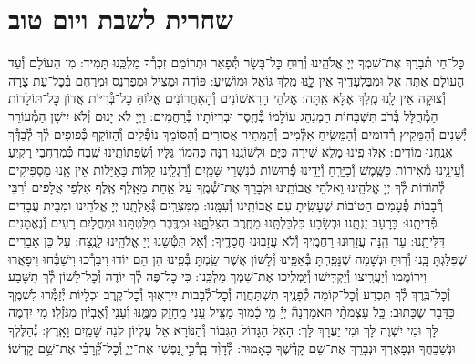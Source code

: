 \documentclass[twoside, openany, parskip=half, 11pt]{book}
\begin{document}
\chapter[שחרית לשבת ויו״ט]{ שחרית לשבת ויום טוב }




\label{nishmas}
כׇּל־חַי תְּ֯בָרֵךְ אֶת־שִׁמְךָ יְיָ אֱלֹהֵֽינוּ וְ֯רֽוּחַ כׇּל־בָּשָׂר תְּ֯פָאֵר וּתְרוֹמֵם זִכְרְ֯ךָ מַלְכֵּֽנוּ תָּמִיד: מִן הָעוֹלָם וְ֯עַד הָעוֹלָם אַתָּה אֵל וּמִבַּלְעָדֶֽיךָ אֵין לׇׇׇֽנּוּ מֶֽלֶךְ גּוֹאֵל וּמוֹשִֽׁיעַ:
פּוֹדֶה וּמַצִיל וּמְפַרְנֵס וּמְרַחֵם בְּ֯כׇל־עֵת צָרָה וְ֯צוּקָה אֵין לָֽנוּ מֶֽלֶךְ אֶלָּא אַֽתָּה: אֱלֹהֵי הָרִאשׁוֹנִים וְ֯הָאַחֲרוֹנִים אֱלֽוֹהַּ כׇּל־בְּ֯רִיּוֹת אֲדוֹן כׇּל־תּוֹלָדוֹת הַמְ֯הֻלָּל בְּ֯רֹב תִּשְׁבָּחוֹת הַמְנַהֵג עוֹלָמוֹ בְּ֯חֶֽסֶד וּבְרִיּוֹתָיו בְּ֯רַחֲמִים: וַיְיָ לֹא יָנוּם וְ֯לֹא יִישָׁן הַמְ֯עוֹרֵר יְ֯שֵׁנִים וְ֯הַמֵּקִיץ רְ֯דוּמִים וְ֯הַמֵּשִֽׂיחַ אִלְּ֯מִים וְ֯הַמַּתִּיר אֲסוּרִים וְ֯הַסּוֹמֵךְ נוֹפְ֯לִים וְ֯הַזּוֹקֵף כְּ֯פוּפִים לְ֯ךָ לְ֯בַדְּ֯ךָ אֲנַֽחְנוּ מוֹדִים: אִֽלּוּ פִֽינוּ מָלֵא שִׁירָה כַּיָּם וּלְשׁוֹנֵֽנוּ רִנָּה כַּהֲמוֹן גַּלָּיו וְ֯שִׂפְתוֹתֵֽינוּ שֶֽׁבַח כְּ֯מֶרְחֲבֵי רָקִֽיעַ וְ֯עֵינֵֽינוּ מְ֯אִירוֹת כַּשֶּֽׁמֶשׁ וְ֯כַיָּרֵֽחַ וְ֯יָדֵֽינוּ פְּ֯רוּשׂוֹת כְּ֯נִשְׁרֵי שָּׁמָֽיִם וְ֯רַגְלֵֽינוּ קַלּוֹת כָּאַיָּלוֹת אֵין אָֽנוּ מַסְפִּיקִים לְ֯הוֹדוֹת לְ֯ךָ יְיָ אֱלֹהֵֽינוּ וֵאלֹהֵי אֲבוֹתֵֽינוּ וּלְבָרֵךְ אֶת־שְׁ֯מֶֽךָ עַל אַֽחַת מֵאָֽלֶף אֶֽלֶף אַלְפֵי אֲלָפִים וְ֯רִבֵּי רְ֯בָבוֹת פְּ֯עָמִים הַטּוֹבוֹת שֶׁעָשִֽׂיתָ עִם אֲבוֹתֵֽינוּ וְ֯עִמָּֽנוּ: מִמִּצְרַֽיִם גְּ֯אַלְתָּֽנוּ יְיָ אֱלֹהֵֽינוּ וּמִבֵּית עֲבָדִים פְּ֯דִיתָֽנוּ: בָּרָעָב זַנְתָּֽנוּ וּבְשָׂבָע כִּלְכַּלְתָּֽנוּ מֵחֶֽרֶב הִצַּלְתׇׇׇּֽנּוּ וּמִדֶּֽבֶר מִלַּטְתָּֽנוּ וּמֵחֳלָיִם רָעִים וְ֯נֶאֱמָנִים דִּלִּיתָֽנוּ: עַד הֵֽנָּה עֲזָרֽוּנוּ רַחֲמֶֽיךָ וְ֯לֹא עֲזָבֽוּנוּ חֲסָדֶֽיךָ: וְ֯אַל תִּטְּ֯שֵׁנוּ יְיָ אֱלֹהֵֽינוּ לָנֶֽצַח: עַל כֵּן אֵבָרִים שֶׁפִּלַּגְתָּ בָּֽנוּ וְ֯רֽוּחַ וּנְשָׁמָה שֶׁנָּפַֽחְתָּ בְּ֯אַפֵּֽינוּ וְ֯לָשׁוֹן אֲשֶׁר שַֽׂמְתָּ בְּ֯פִֽינוּ הֵן הֵם יוֹדוּ וִיבָרְ֯כוּ וִישַׁבְּ֯חוּ וִיפָאֲרוּ וִירוֹמֲמוּ וְ֯יַעֲרִֽיצוּ וְ֯יַקְדִּֽישׁוּ וְ֯יַמְלִֽיכוּ אֶת־שִׁמְךָ מַלְכֵּֽנוּ: כִּי כׇל־פֶּה לְ֯ךָ יוֹדֶה וְ֯כׇל־לָשׁוֹן לְ֯ךָ תִּשָּׁבַע וְ֯כׇל־בֶּֽרֶךְ לְ֯ךָ תִּכְרַע וְ֯כׇל־קוֹמָה לְ֯פָנֶֽיךָ תִשְׁתַּחֲוֶה וְ֯כׇל־לְ֯בָבוֹת יִירָאֽוּךָ וְ֯כׇל־קֶֽרֶב וּכְלָיוֹת יְ֯זַמְּ֯רוּ לִשְׁמֶֽךָ כַּדָּבָר שֶׁכָּתוּב:
כָּ֥ל עַצְמֹתַ֨י תֹּאמַרְנָה֘ יְיָ֗ מִ֤י כָ֫מ֥וֹךָ מַצִּ֣יל עָ֭נִי מֵֽחָזָ֣ק מִמֶּ֑נּוּ וְ֯עָנִ֥י וְ֝֯אֶבְי֗וֹן מִגֹּֽזְ֯לֽוֹ׃ מִי יִדְמֶה לָּךְ וּמִי יִשְׁוֶה לָּךְ וּמִי יַעֲרָךְ לָּךְ: הָאֵל הַגָּדוֹל הַגִּבּוֹר וְ֯הַנּוֹרָא אֵל עֶלְיוֹן קֹנֵה שָׁמַֽיִם וָאָֽרֶץ:
נְ֯הַלֶּלְךָ וּנְשַׁבֵּחֲךָ וּנְפָאֶרְךָ וּנְבָרֵךְ אֶת־שֵׁם קָדְ֯שֶׁךָ כָּאָמוּר:
לְ֯דָוִ֨ד בָּֽרְ֯כִ֣י נַ֭פְשִׁי אֶת־יְיָ֑ וְ֯כׇל־קְ֝֯רָבַ֗י אֶת־שֵׁ֥ם קׇדְשֽׁוֹ׃
\end{document}
